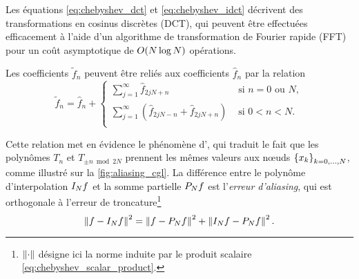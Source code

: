 Les équations \eqref{eq:chebyshev_dct} et \eqref{eq:chebyshev_idct} décrivent des transformations en cosinus discrètes (DCT), qui peuvent être effectuées efficacement à l'aide d'un algorithme de transformation de Fourier rapide (FFT) pour un coût asymptotique de $\bigO{N \log N}$ opérations.
\par
Les coefficients $\tilde{f}_n$ peuvent être reliés aux coefficients $\hat{f}_n$ par la relation
\begin{equation}
	\tilde{f}_n = \hat{f}_n + 
	\begin{cases}
		\displaystyle\sum_{j=1}^{\infty} \hat{f}_{2jN + n} & \text{\ si\ } n = 0 \text{\ ou\ } N,   \\[4ex]
		\displaystyle\sum_{j=1}^{\infty} \left( \hat{f}_{2jN - n} + \hat{f}_{2jN + n} \right) & \text{\ si\ } 0 < n < N.\\ 
	\end{cases}
	\label{eq:chebyshev_aliasing}
\end{equation}

Cette relation met en évidence le phénomène d', qui traduit le fait que les polynômes $T_n$ et $T_{\pm n \bmod{2N}}$ prennent les mêmes valeurs aux n\oe uds $\family{x}{k}{0}{N}$, comme illustré sur la \autoref{fig:aliasing_cgl}.
La différence entre le polynôme d'interpolation $\interpolant{f}{N}$ et la somme partielle $\truncseries{f}{N}$ est l'\textit{erreur d'aliasing}, qui est orthogonale à l'erreur de troncature\footnote{$\normtwo{\cdot}$ désigne ici la norme induite par le produit scalaire \eqref{eq:chebyshev_scalar_product}.}
\begin{equation}
	\normtwo{f - \interpolant{f}{N}}^2 = 
	\normtwo{f - \truncseries{f}{N}}^2 + 
	\normtwo{\interpolant{f}{N} - \truncseries{f}{N}}^2.
	\label{eq:chebyshev_aliasing_esrror}
\end{equation}

